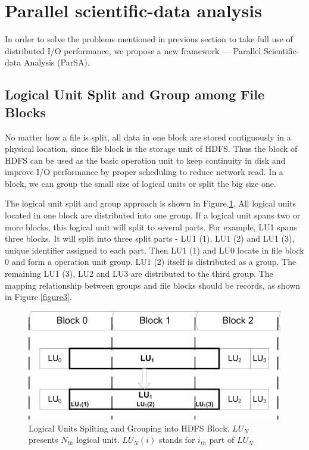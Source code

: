 \documentclass[preprint,12pt]{elsarticle}
\begin{document}
\section{Parallel scientific-data analysis}
In order to solve the problems mentioned in previous section to take full use of distributed I/O performance, we propose a new framework 
--- Parallel Scientific-data Analysis (ParSA). 

\subsection{Logical Unit Split and Group among File Blocks}
No matter how a file is split, all data in one block are stored contiguously in a physical location, since file block is the storage
unit of HDFS. Thus the block of HDFS can be used as the basic operation unit to keep continuity in disk and improve I/O performance 
by proper scheduling to reduce network read. In a block, we can group the small size of logical units or split the big size one.\par
The logical unit split and group approach is shown in Figure.\ref{figure2}. All logical units located in one block are distributed 
into one group. If a logical unit spans two or more blocks, this logical unit will split to several parts. For example, LU1 spans three 
blocks. It will split into three split parts - LU1 (1), LU1 (2) and LU1 (3), unique identifier assigned to each part. Then LU1 (1) 
and LU0 locate in file block 0 and form a operation unit group. LU1 (2) itself is distributed as a group. The remaining LU1 (3), LU2 
and LU3 are distributed to the third group. The mapping relationship between groups and file blocks should be records, as shown in 
Figure.\ref{figure3}. \par

\begin{figure}
	\centering
	\includegraphics{figure2}
	\caption{Logical Units Spliting and Grouping into HDFS Block. $LU_N$ presents $N_{th}$ logical unit. $LU_N(i)$ stands for 
			$i_{th}$ part of $LU_N$}
	\label{figure2}
\end{figure}
\end{document}
